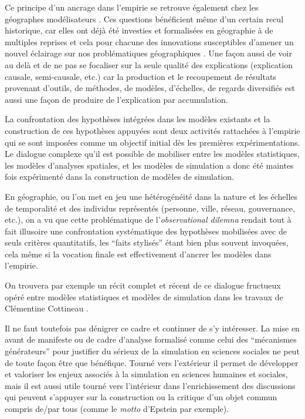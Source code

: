Ce principe d'un ancrage dans l'empirie se retrouve également chez les géographes modélisateurs \autocite{Banos2013}. Ces questions bénéficient même d'un certain recul historique, car elles ont déjà été investies et formalisées en géographie à de multiples reprises et cela pour chacune des innovations susceptibles d'amener un nouvel éclairage sur nos problématiques géographiques \autocite{Sanders2000, Mathian2014}. Une façon aussi de voir au delà et de ne pas se focaliser sur la seule qualité des explications (explication causale, semi-causale, etc.) car la production et le recoupement de résultats provenant d'outils, de méthodes, de modèles, d'échelles, de regards diversifiés est aussi une façon de produire de l'explication par accumulation.

La confrontation des hypothèses intégrées dans les modèles existants \autocite{Pumain1983, Sanders1984} et la construction de ces hypothèses appuyées \autocite{AMORAL1983} sont deux activités rattachées à l'empirie qui se sont imposées comme un objectif initial dès les premières expérimentations. Le dialogue complexe qu'il est possible de mobiliser entre les modèles statistiques, les modèles d'analyses spatiales, et les modèles de simulation a donc été maintes fois expérimenté dans la construction de modèles de simulation.

En géographie, ou l'on met en jeu une hétérogénéité dans la nature et les échelles de temporalité et des individus représentés (personne, ville, réseau, gouvernance, etc.), on a vu que cette problématique de l'\textit{observational dilemna} rendait tout à fait illusoire une confrontation systématique des hypothèses mobilisées avec de seuls critères quantitatifs, les \enquote{faits stylisés} étant bien plus souvent invoquées, cela même si la vocation finale est effectivement d'ancrer les modèles dans l'empirie.

On trouvera par exemple un récit complet et récent de ce dialogue fructueux opéré entre modèles statistiques et modèles de simulation dans les travaux de Clémentine Cottineau \autocites{Cottineau2014a, Cottineau2014b}.

Il ne faut toutefois pas dénigrer ce cadre et continuer de s'y intéresser. La mise en avant de manifeste \textcite{Conte2012} ou de cadre d'analyse formalisé comme celui des \enquote{mécanismes générateurs} pour justifier du sérieux de la simulation en sciences sociales ne peut de toute façon être que bénéfique. Tourné vers l'extérieur il permet de développer et valoriser les enjeux associés à la simulation en sciences humaines et sociales, mais il est aussi utile tourné vers l'intérieur dans l'enrichissement des discussions qui peuvent s'appuyer sur la construction ou la critique d'un objet commun compris de/par tous (comme le \textit{motto} d'Epstein par exemple).

